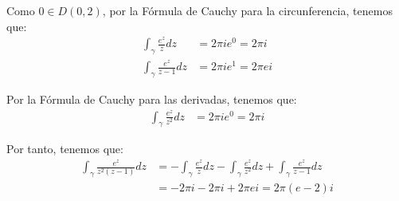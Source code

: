 \begin{ejercicio}
\begin{enumerate}
        Como $0\in D(0,2)$, por la Fórmula de Cauchy para la circunferencia, tenemos que:
        \begin{align*}
            \int_{\gamma} \frac{e^z}{z}dz &= 2\pi i e^0 = 2\pi i\\
            \int_{\gamma} \frac{e^z}{z-1}dz &= 2\pi i e^1 = 2\pi e i
        \end{align*}

        Por la Fórmula de Cauchy para las derivadas, tenemos que:
        \begin{align*}
            \int_{\gamma} \frac{e^z}{z^2}dz &= 2\pi i e^0 = 2\pi i
        \end{align*}

        Por tanto, tenemos que:
        \begin{align*}
            \int_{\gamma} \frac{e^z}{z^2(z-1)}dz &= -\int_{\gamma} \frac{e^z}{z}dz - \int_{\gamma} \frac{e^z}{z^2}dz + \int_{\gamma} \frac{e^z}{z-1}dz\\
            &= -2\pi i - 2\pi i + 2\pi e i = 2\pi(e-2)i
        \end{align*}
    \end{enumerate}
\end{ejercicio}

